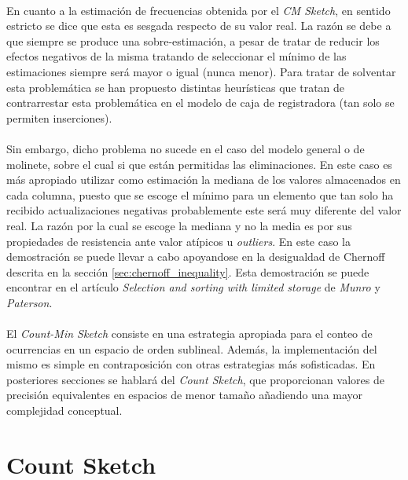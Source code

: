 \documentclass{subfiles}
\begin{document}
      \paragraph{}
      En cuanto a la estimación de frecuencias obtenida por el \emph{CM Sketch}, en sentido estricto se dice que esta es sesgada respecto de su valor real. La razón se debe a que siempre se produce una sobre-estimación, a pesar de tratar de reducir los efectos negativos de la misma tratando de seleccionar el mínimo de las estimaciones siempre será mayor o igual (nunca menor). Para tratar de solventar esta problemática se han propuesto distintas heurísticas que tratan de contrarrestar esta problemática en el modelo de caja de registradora (tan solo se permiten inserciones).

      \paragraph{}
      Sin embargo, dicho problema no sucede en el caso del modelo general o de molinete, sobre el cual si que están permitidas las eliminaciones. En este caso es más apropiado utilizar como estimación la mediana de los valores almacenados en cada columna, puesto que se escoge el mínimo para un elemento que tan solo ha recibido actualizaciones negativas probablemente este será muy diferente del valor real. La razón por la cual se escoge la mediana y no la media es por sus propiedades de resistencia ante valor atípicos u \emph{outliers}. En este caso la demostración se puede llevar a cabo apoyandose en la desigualdad de Chernoff descrita en la sección \ref{sec:chernoff_inequality}. Esta demostración se puede encontrar en el artículo \emph{Selection and sorting with limited storage }\cite{munro1980selection} de \emph{Munro} y \emph{Paterson}.

      \paragraph{}
      El \emph{Count-Min Sketch} consiste en una estrategia apropiada para el conteo de ocurrencias en un espacio de orden sublineal. Además, la implementación del mismo es simple en contraposición con otras estrategias más sofisticadas. En posteriores secciones se hablará del \emph{Count Sketch}, que proporcionan valores de precisión equivalentes en espacios de menor tamaño añadiendo una mayor complejidad conceptual.


    \section{Count Sketch}
    \label{sec:count_sketch}
\end{document}

